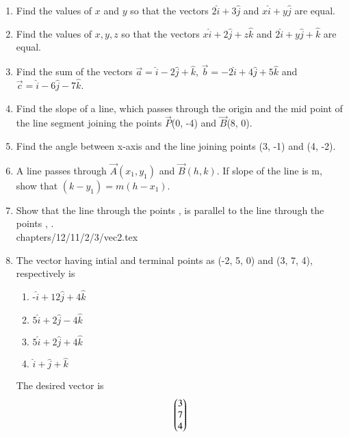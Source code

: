 \begin{enumerate}[label=\thesubsection.\arabic*, ref=\thesubsection.\theenumi]
	\item 		Find the values of $x$ and $y$ so that the vectors
$2\hat{i}+3\hat{j}$
and 
$x\hat{i}+y\hat{j}$
are equal.
\\
\solution

\item Find the values of $x, y, z$ so that the vectors 
$x\hat{i}+2\hat{j}+z\hat{k}$
and 
$2\hat{i}+y\hat{j}+\hat{k}$
are equal.
\item Find the sum of the vectors $\vec{a}=\hat{i}-2\hat{j}+\hat{k}$,  $\vec{b}=-2\hat{i}+4\hat{j}+5\hat{k}$ and $\vec{c}=\hat{i}-6\hat{j}-7\hat{k}$.
\item Find the slope of a line,  which passes through the origin and the mid point of the line segment joining the points $\vec{P}$(0, -4) and $\vec{B}$(8, 0).
\label{chapters/11/10/1/5}
	\\
	\solution

\item Find the angle between x-axis and the line joining points (3, -1) and (4, -2).
\label{chapters/11/10/1/10}
\\
\solution 

\item A line passes through $\vec{A}(x_1, y_1)$ and $\vec{B}(h, k)$. If slope of the line is m,  show that $(k-y_1)=m(h-x_1)$.
\label{chapters/11/10/1/12}
\\
\solution 

\item
Show that the line through the points ,  is parallel to the line through the points , .
	\label{12.11.2.3}
\\
\solution
	 {chapters/12/11/2/3/vec2.tex}
\item The vector having intial and terminal points as (-2, 5, 0) and (3, 7, 4), respectively is
	\begin{enumerate}
\item -$\hat{i}+12\hat{j}+4\hat{k}$
\item $5\hat{i}+2\hat{j}-4\hat{k}$
\item $5\hat{i}+2\hat{j}+4\hat{k}$
\item $\hat{i}+\hat{j}+\hat{k}$
\end{enumerate}
\solution
The desired vector is
\begin{align}
	\myvec{3 \\ 7 \\ 4}

\end{align}
\end{enumerate}
